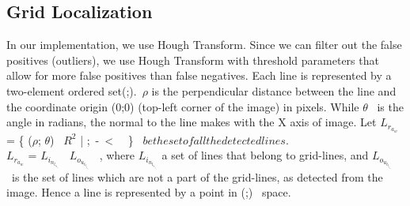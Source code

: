 \documentclass[12pt]{article}
\begin{document}
\subsection{Grid Localization}
 In our implementation, we use Hough Transform. Since we can filter out the false positives (outliers), we use Hough Transform  with  threshold  parameters  that  allow  for  more false  positives  than  false  negatives.  Each  line  is  represented by  a  two-element  ordered  set(\rho;\theta).\  $\rho$  is  the  perpendicular distance between the line and the coordinate origin (0;0) (top-left  corner  of  the  image)  in  pixels.  While $\theta$ \  is  the  angle  in radians,  the  normal  to  the  line  makes  with  the X axis  of image.   Let $L_r_a_w$= \{ ($\rho$; $\theta$) \in \  $R^2$ | \rho {};\ -\pi \ \leq \theta < \ \pi \ \} \   $be the set of all the detected lines.$ 
 \\ 
 $L_r_a_w$ = $L_i_n_l_i_e_r_s$ \bigcup \  $L_o_u_t_l_i_e_r_s$ \ , where $L_i_n_l_i_e_r_i_s$  a  set  of  lines  that  belong  to  grid-lines,  and $L_o_u_t_l_i_e_r$ \ is  the set of lines which are not a part of the grid-lines, as detected from the image. Hence a line is represented by a point in (\rho;\theta) \ space.
\end{document}
